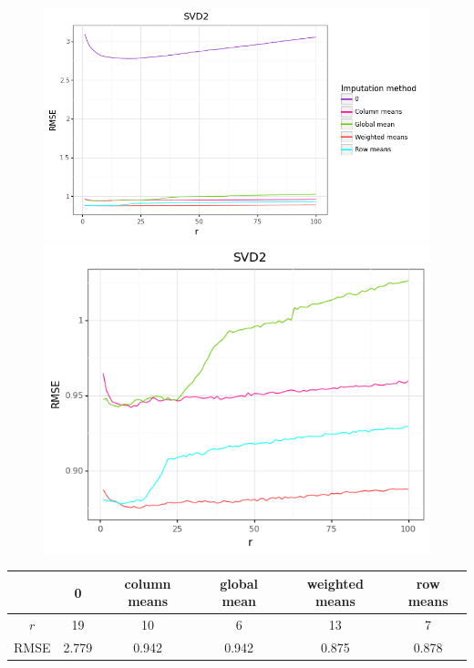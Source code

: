 \documentclass[11pt]{amsart}
\begin{document}
\begin{figure}[H]
\centering
\begin{minipage}{.5\textwidth}
  \centering
  \includegraphics[scale=0.43]{svd2_1}
\end{minipage}%
\begin{minipage}{.5\textwidth}
  \centering
  \includegraphics[scale=0.43]{svd2_2}
\end{minipage}
\end{figure}

\begin{table}[H]
\begin{tabular}{c|ccccc}
& 0 & column means & global mean & weighted means & row means \\
\hline
$r$ & 19 & 10 & 6 & 13 & 7 \\
RMSE & 2.779 & 0.942 & 0.942 & 0.875 & 0.878 \\
\end{tabular}
\end{table}
\end{document}
